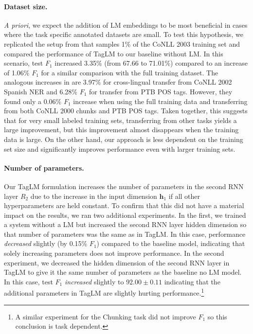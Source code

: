 \documentclass[11pt,a4paper]{article}
\begin{document}
\paragraph{Dataset size.} \textit{A priori}, we expect the addition of LM embeddings to be most beneficial in cases
where the task specific annotated datasets are small.  To test this hypothesis, we replicated the setup from \citet{yang-transfer-iclr07}
that samples 1\% of the CoNLL 2003 training set and compared the performance of TagLM to our baseline without LM.
In this scenario, test $F_1$ increased 3.35\% (from 67.66 to 71.01\%) compared to an increase of 1.06\% $F_1$ for a similar comparison
with the full training dataset.  The analogous increases in \citet{yang-transfer-iclr07} are 3.97\% for cross-lingual
transfer from CoNLL 2002 Spanish NER and 6.28\% $F_1$ for transfer from PTB POS tags.  However, they found only a 0.06\% $F_1$
increase when using the full training data and transferring from both CoNLL 2000 chunks and PTB POS tags.
Taken together, this suggests that for very small labeled training sets, transferring from other tasks yields a large improvement, but this improvement almost disappears when the training data is large.
On the other hand, our approach is less dependent on the training set size and significantly improves performance even with larger training sets.

\paragraph{Number of parameters.}  Our TagLM formulation increases the
number of parameters in the second  RNN layer $R_2$ due to the increase
in the input dimension $\mathbf{h}_1$ if all other hyperparameters are held constant.
To confirm that this did not have a material impact on the results, we ran two additional experiments.
In the first, we trained a system without a LM but increased the second  RNN layer
hidden dimension so that number of parameters was the same as in TagLM.
In this case, performance \textit{decreased} slightly (by 0.15\% $F_1$) compared to the baseline model, indicating
that solely increasing parameters does not improve performance.  In the second experiment, we decreased
the hidden dimension of the second RNN layer in TagLM to give it the same number
of parameters as the baseline no LM model.  In this case, test $F_1$ \textit{increased} slightly
to $92.00 \pm 0.11$ indicating that the additional parameters in TagLM are slightly hurting performance.\footnote{A similar experiment
for the Chunking task did not improve $F_1$ so this conclusion is task dependent.} 
\end{document}
